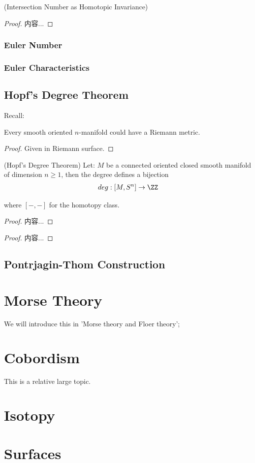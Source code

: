 \documentclass[Total.tex]{subfiles}
\begin{document}
				\begin{theorem}
					(Intersection Number as Homotopic Invariance)
				\end{theorem}
				\begin{proof}
					内容...
				\end{proof}
				
				\subsection{Euler Number}
				
				\subsection{Euler Characteristics}
				
		
		\section{Hopf's Degree Theorem}
			Recall:
			\begin{lemma}
				Every smooth oriented $n$-manifold could have a Riemann metric.
			\end{lemma}
			\begin{proof}
				Given in Riemann surface.
			\end{proof}
			\begin{theorem}
				(Hopf's Degree Theorem) Let: $M$ be a connected oriented closed smooth manifold of dimension $n\geq 1$, then the degree defines a bijection
				\begin{gather*}
					deg:[M,S^n]\rightarrow \ZZ
				\end{gather*}
				
				where $[-,-]$ for the homotopy class. 
			\end{theorem}
			\begin{proof}
				内容...
			\end{proof}
			
			\begin{corollary}
				
			\end{corollary}
			\begin{proof}
				内容...
			\end{proof}
			
		\section{Pontrjagin-Thom Construction}
		
	
	\chapter{Morse Theory}
		We will introduce this in 'Morse theory and Floer theory';
	\chapter{Cobordism}
		This is a relative large topic. 
	\chapter{Isotopy}
	
	\chapter{Surfaces}
\end{document}
